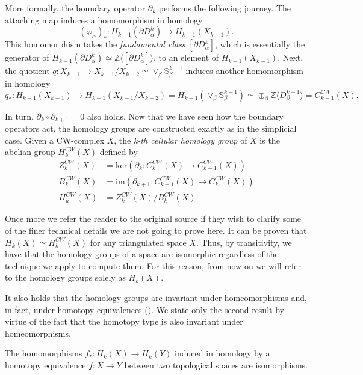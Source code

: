 More formally, the boundary operator $\partial_k$ performs the following journey. The attaching map induces a homomorphism in homology
\[
(\varphi_{\alpha})_* : H_{k-1}(\partial D_{\alpha}^k)\to H_{k-1}(X_{k-1}).
\]
This homomorphism takes the \textit{fundamental class} $[\partial D_{\alpha}^k]$, which is essentially the generator of $H_{k-1}(\partial D_{\alpha}^k)\simeq \mathbb{Z}\langle [\partial D_{\alpha}^k]\rangle$, to an element of $H_{k-1}(X_{k-1})$. Next, the quotient $q: X_{k-1}\to X_{k-1}/X_{k-2} \simeq \vee_{\beta}\mathbb{S}_{\beta}^{k-1}$ induces another homomorphism in homology
\[
q_*: H_{k-1}(X_{k-1}) \to H_{k-1}(X_{k-1}/X_{k-2}) = H_{k-1}(\vee_{\beta}\mathbb{S}_{\beta}^{k-1}) \simeq \oplus_{\beta}\mathbb{Z}\langle D^{k-1}_{\beta} \rangle = C^{CW}_{k-1}(X). %
\]

In turn, $\partial_{k}\circ\partial_{k+1} = 0$ also holds. Now that we have seen how the boundary operators act, the homology groups are constructed exactly as in the simplicial case. Given a CW-complex $X$, the \textit{k-th cellular homology group} of $X$ is the abelian group $H^{CW}_k(X)$ defined by
\begin{align*}
    Z^{CW}_k(X) &= \text{ker}(\partial_k: C^{CW}_k(X) \to C^{CW}_{k-1}(X)) \\
    B^{CW}_k(X) &= \text{im}(\partial_{k+1}: C^{CW}_{k+1}(X) \to C^{CW}_{k}(X)) \\
    H^{CW}_k(X) &= Z^{CW}_k(X)/B^{CW}_k(X).
\end{align*}

Once more we refer the reader to the original source \cite{munoz2021} if they wish to clarify some of the finer technical details we are not going to prove here. It can be proven that $H_k(X)\simeq H^{CW}_k(X)$ for any triangulated space $X$. Thus, by transitivity, we have that the homology groups of a space are isomorphic regardless of the technique we apply to compute them. For this reason, from now on we will refer to the homology groups solely as $H_k(X)$.

It also holds that the homology groups are invariant under homeomorphisms and, in fact, under homotopy equivalences (\cite[p.~111]{hatcher2002}). We state only the second result by virtue of the fact that the homotopy type is also invariant under homeomorphisms.

\begin{theorem}
    The homomorphisms $f_*:H_k(X)\to H_k(Y)$ induced in homology by a homotopy equivalence $f:X\to Y$ between two topological spaces are isomorphisms.
\end{theorem}

